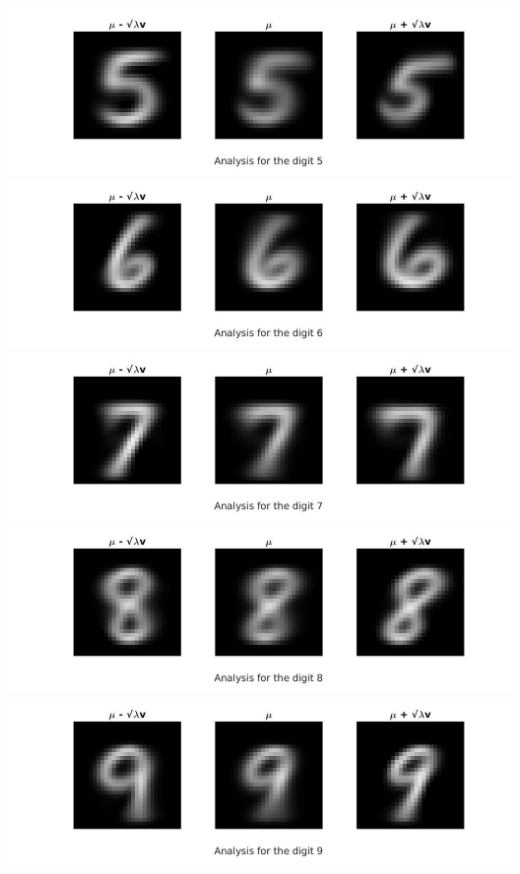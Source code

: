 \documentclass[12pt, a4paper]{article}
\begin{document}
\includegraphics[width=\textwidth, height = 0.25\paperheight]{Comparison_mu_5}
\includegraphics[width=\textwidth, height = 0.25\paperheight]{Comparison_mu_6}
\includegraphics[width=\textwidth, height = 0.25\paperheight]{Comparison_mu_7}
\includegraphics[width=\textwidth, height = 0.25\paperheight]{Comparison_mu_8}
\includegraphics[width=\textwidth, height = 0.25\paperheight]{Comparison_mu_9} 
 
\end{document}

